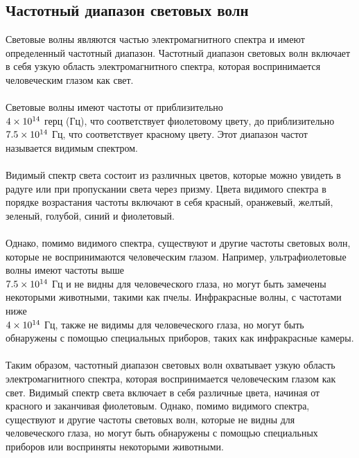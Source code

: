 \documentclass{article}
\begin{document}
\subsection{Частотный диапазон световых волн}
Световые волны являются частью электромагнитного спектра и имеют определенный частотный диапазон. Частотный диапазон световых волн включает в себя узкую область электромагнитного спектра, которая воспринимается человеческим глазом как свет.\\
~\\
Световые волны имеют частоты от приблизительно \\$4 \times 10^{14}\\$ герц (Гц), что соответствует фиолетовому цвету, до приблизительно \\$7.5 \times 10^{14}\\$ Гц, что соответствует красному цвету. Этот диапазон частот называется видимым спектром.\\
~\\
Видимый спектр света состоит из различных цветов, которые можно увидеть в радуге или при пропускании света через призму. Цвета видимого спектра в порядке возрастания частоты включают в себя красный, оранжевый, желтый, зеленый, голубой, синий и фиолетовый.\\
~\\
Однако, помимо видимого спектра, существуют и другие частоты световых волн, которые не воспринимаются человеческим глазом. Например, ультрафиолетовые волны имеют частоты выше \\$7.5 \times 10^{14}\\$ Гц и не видны для человеческого глаза, но могут быть замечены некоторыми животными, такими как пчелы. Инфракрасные волны, с частотами ниже \\$4 \times 10^{14}\\$ Гц, также не видимы для человеческого глаза, но могут быть обнаружены с помощью специальных приборов, таких как инфракрасные камеры.\\
~\\
Таким образом, частотный диапазон световых волн охватывает узкую область электромагнитного спектра, которая воспринимается человеческим глазом как свет. Видимый спектр света включает в себя различные цвета, начиная от красного и заканчивая фиолетовым. Однако, помимо видимого спектра, существуют и другие частоты световых волн, которые не видны для человеческого глаза, но могут быть обнаружены с помощью специальных приборов или восприняты некоторыми животными.\\
~\\
\end{document}
